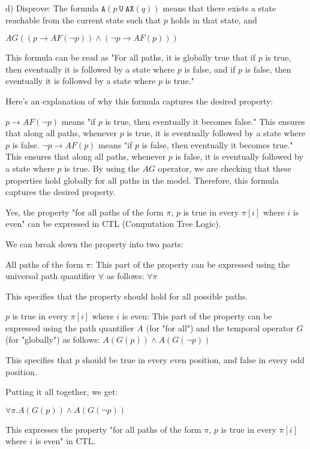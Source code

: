 \documentclass[11pt]{article}
\newcommand{\ax}[1]{\texttt{AX}(#1)}
\newcommand{\au}[2]{\texttt{A}(#1\ \texttt{U}\ #2)}
\begin{document}
d) Disprove: The formula $\au{p}{\ax{q}}$ means that there exists a state reachable from the current state such that $p$ holds in that state, and



$AG((p \rightarrow AF(\neg p)) \wedge (\neg p \rightarrow AF(p)))$

This formula can be read as "For all paths, it is globally true that if $p$ is true, then eventually it is followed by a state where $p$ is false, and if $p$ is false, then eventually it is followed by a state where $p$ is true."

Here's an explanation of why this formula captures the desired property:

$p \rightarrow AF(\neg p)$ means "if $p$ is true, then eventually it becomes false." This ensures that along all paths, whenever $p$ is true, it is eventually followed by a state where $p$ is false.
$\neg p \rightarrow AF(p)$ means "if $p$ is false, then eventually it becomes true." This ensures that along all paths, whenever $p$ is false, it is eventually followed by a state where $p$ is true.
By using the $AG$ operator, we are checking that these properties hold globally for all paths in the model. Therefore, this formula captures the desired property.

\newpage 

Yes, the property "for all paths of the form $\pi$, $p$ is true in every $\pi[i]$ where $i$ is even" can be expressed in CTL (Computation Tree Logic).

We can break down the property into two parts:

All paths of the form $\pi$:
This part of the property can be expressed using the universal path quantifier $\forall$ as follows:
$\forall \pi$

This specifies that the property should hold for all possible paths.

$p$ is true in every $\pi[i]$ where $i$ is even:
This part of the property can be expressed using the path quantifier $A$ (for "for all") and the temporal operator $G$ (for "globally") as follows:
$A(G(p)) \land A(G(\neg p))$

This specifies that $p$ should be true in every even position, and false in every odd position.

Putting it all together, we get:

$\forall \pi . A(G(p)) \land A(G(\neg p))$

This expresses the property "for all paths of the form $\pi$, $p$ is true in every $\pi[i]$ where $i$ is even" in CTL.
\end{document}

